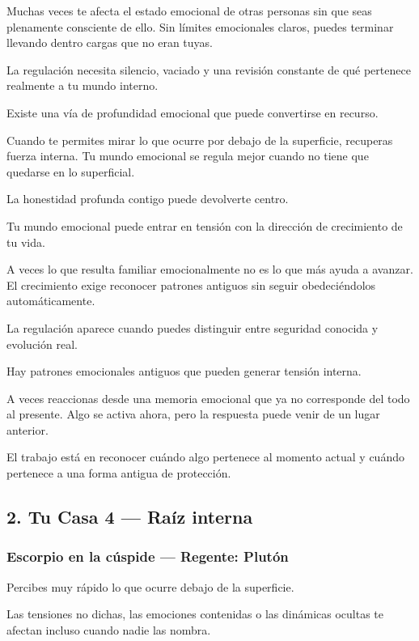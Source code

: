 \documentclass[11pt,a4paper]{article}
\begin{document}
Muchas veces te afecta el estado emocional de otras personas sin que seas plenamente consciente de ello. Sin límites emocionales claros, puedes terminar llevando dentro cargas que no eran tuyas.

La regulación necesita silencio, vaciado y una revisión constante de qué pertenece realmente a tu mundo interno.

Existe una vía de profundidad emocional que puede convertirse en recurso.

Cuando te permites mirar lo que ocurre por debajo de la superficie, recuperas fuerza interna. Tu mundo emocional se regula mejor cuando no tiene que quedarse en lo superficial.

La honestidad profunda contigo puede devolverte centro.

Tu mundo emocional puede entrar en tensión con la dirección de crecimiento de tu vida.

A veces lo que resulta familiar emocionalmente no es lo que más ayuda a avanzar. El crecimiento exige reconocer patrones antiguos sin seguir obedeciéndolos automáticamente.

La regulación aparece cuando puedes distinguir entre seguridad conocida y evolución real.

Hay patrones emocionales antiguos que pueden generar tensión interna.

A veces reaccionas desde una memoria emocional que ya no corresponde del todo al presente. Algo se activa ahora, pero la respuesta puede venir de un lugar anterior.

El trabajo está en reconocer cuándo algo pertenece al momento actual y cuándo pertenece a una forma antigua de protección.

\subsection{2. Tu Casa 4 — Raíz interna}

\subsubsection*{Escorpio en la cúspide — Regente: Plutón}

Percibes muy rápido lo que ocurre debajo de la superficie.

Las tensiones no dichas, las emociones contenidas o las dinámicas ocultas te afectan incluso cuando nadie las nombra.
\end{document}

